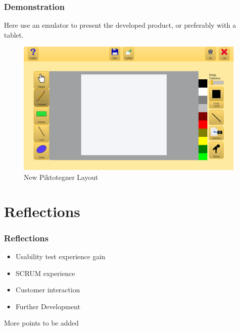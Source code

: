 \documentclass[10pt]{beamer}
\begin{document}
		\begin{frame}
		\frametitle{Demonstration}
		Here use an emulator to present the developed product, or preferably with a tablet.
			\begin{figure}
				\includegraphics[width=\textwidth]{media/final-main-ui}
				\caption{New Piktotegner Layout}
			\end{figure}
		\end{frame}		

	\section{Reflections}
		\begin{frame}
		\frametitle{Reflections}
		\begin{itemize}
			\item Usability test experience gain
			\item SCRUM experience
			\item Customer interaction
			\item Further Development
		\end{itemize}
		More points to be added
		\end{frame}
\end{document}

